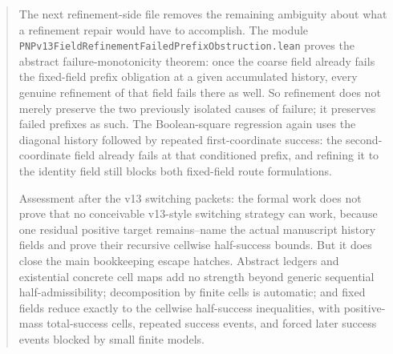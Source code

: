 \documentclass[11pt]{article}
\theoremstyle{remark}
\begin{document}
\begin{abstract}
The next refinement-side file removes the remaining ambiguity about what a
refinement repair would have to accomplish.  The module
\texttt{PNPv13FieldRefinementFailedPrefixObstruction.lean} proves the abstract
failure-monotonicity theorem: once the coarse field already fails the
fixed-field prefix obligation at a given accumulated history, every genuine
refinement of that field fails there as well.  So refinement does not merely
preserve the two previously isolated causes of failure; it preserves failed
prefixes as such.  The Boolean-square regression again uses the diagonal
history followed by repeated first-coordinate success: the second-coordinate
field already fails at that conditioned prefix, and refining it to the
identity field still blocks both fixed-field route formulations.

Assessment after the v13 switching packets: the formal work does not prove that no conceivable
v13-style switching strategy can work, because one residual positive target remains--name the
actual manuscript history fields and prove their recursive cellwise half-success bounds.  But it
does close the main bookkeeping escape hatches.  Abstract ledgers and existential concrete cell
maps add no strength beyond generic sequential half-admissibility; decomposition by finite cells is
automatic; and fixed fields reduce exactly to the cellwise half-success inequalities, with
positive-mass total-success cells, repeated success events, and forced later success events blocked
by small finite models.


\end{abstract}
\end{document}
